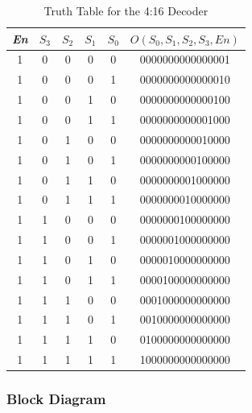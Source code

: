 		\begin{table}[H]
    			\centering
    			\begin{tabular}{|c|c|c|c|c|c|}
    			\hline
    			\hline
        			\textit{En} & $S_3$ & $S_2$ & $S_1$ & $S_0$ & $O(S_0, S_1, S_2, S_3, En)$ \\         			
        			\hline
        			\hline
        			1 & 0 & 0 & 0 & 0 & 0000000000000001 \\
        			\hline 
        			1 & 0 & 0 & 0 & 1 & 0000000000000010 \\ 
        			\hline 
        			1 & 0 & 0 & 1 & 0 & 0000000000000100 \\ 
        			\hline 
        			1 & 0 & 0 & 1 & 1 & 0000000000001000\\ 
        			\hline 
        			1 & 0 & 1 & 0 & 0 & 0000000000010000 \\ 
        			\hline 
        			1 & 0 & 1 & 0 & 1 & 0000000000100000 \\ 
        			\hline 
        			1 & 0 & 1 & 1 & 0 & 0000000001000000 \\ 
        			\hline 
        			1 & 0 & 1 & 1 & 1 & 0000000010000000 \\ 
        			\hline 
       				1 & 1 & 0 & 0 & 0 & 0000000100000000 \\ 
        			\hline 
        			1 & 1 & 0 & 0 & 1 & 0000001000000000 \\ 
        			\hline 
        			1 & 1 & 0 & 1 & 0 & 0000010000000000 \\ 
        			\hline 
        			1 & 1 & 0 & 1 & 1 & 0000100000000000 \\ 
        			\hline 
        			1 & 1 & 1 & 0 & 0 & 0001000000000000 \\ 
        			\hline 
        			1 & 1 & 1 & 0 & 1 & 0010000000000000 \\ 
        			\hline 
        			1 & 1 & 1 & 1 & 0 & 0100000000000000 \\ 
        			\hline 
        			1 & 1 & 1 & 1 & 1 & 1000000000000000 \\ 
        			\hline
        			\hline
    			\end{tabular}
    			\caption{Truth Table for the 4:16 Decoder}
			\end{table}
	
	\subsubsection{{Block Diagram}}
	
